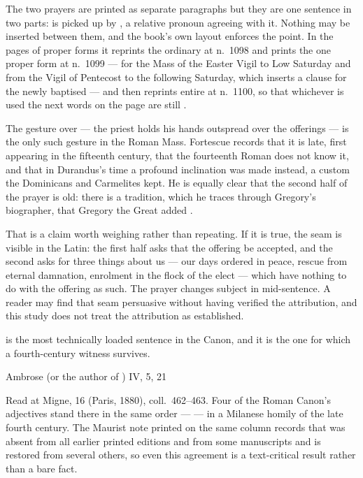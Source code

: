 The two prayers are printed as separate paragraphs but they are one sentence in
two parts:  is picked up by , a relative pronoun agreeing with it. Nothing may be inserted
between them, and the book's own layout enforces the point. In the pages of
proper forms it reprints the ordinary  at n.~1098 and
prints the one proper form at n.~1099 --- for the Mass of the Easter Vigil to
Low Saturday and from the Vigil of Pentecost to the following Saturday, which
inserts a clause for the newly baptised --- and then reprints  entire at n.~1100, so that whichever  is used
the next words on the page are still .

The gesture over  --- the priest holds his hands
outspread over the offerings --- is the only such gesture in the Roman Mass.
Fortescue records that it is late, first appearing in the fifteenth century,
that the fourteenth Roman  does not know it, and that in Durandus's
time a profound inclination was made instead, a custom the Dominicans and
Carmelites kept. He is equally clear that the second half of the prayer is old:
there is a tradition, which he traces through Gregory's biographer, that Gregory
the Great added .

That is a claim worth weighing rather than repeating. If it is true, the seam is
visible in the Latin: the first half asks that the offering be accepted, and the
second asks for three things about us --- our days ordered in peace, rescue
from eternal damnation, enrolment in the flock of the elect --- which have
nothing to do with the offering as such. The prayer changes subject in
mid-sentence. A reader may find that seam persuasive without having verified
the attribution, and this study does not treat the attribution as established.

 is the most technically loaded sentence in the
Canon, and it is the one for which a fourth-century witness survives.

\begin{witnesscard}{Ambrose (or the author of ) IV, 5, 21}
\par
\vspace{0.3em}
Read at Migne,  16 (Paris, 1880), coll.~462--463. Four
of the Roman Canon's adjectives stand there in the same order ---
 --- in a Milanese
homily of the late fourth century. The Maurist note printed on the same column
records that  was absent from all earlier printed editions and
from some manuscripts and is restored from several others, so even this
agreement is a text-critical result rather than a bare fact.
\end{witnesscard}

